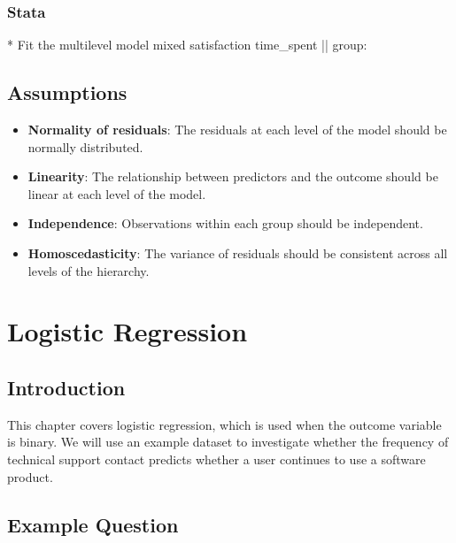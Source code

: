 \documentclass[
  letterpaper,
  DIV=11,
  numbers=noendperiod]{scrreprt}
\newenvironment{Shaded}{\begin{snugshade}}{\end{snugshade}}
\newcommand{\FunctionTok}[1]{\textcolor[rgb]{0.28,0.35,0.67}{#1}}
\newcommand{\KeywordTok}[1]{\textcolor[rgb]{0.00,0.23,0.31}{#1}}
\newcommand{\NormalTok}[1]{\textcolor[rgb]{0.00,0.23,0.31}{#1}}
\providecommand{\tightlist}{%
  \setlength{\itemsep}{0pt}\setlength{\parskip}{0pt}}\usepackage{longtable,booktabs,array}
\begin{document}
\subsection{Stata}\label{stata-2}

\begin{Shaded}
\begin{Highlighting}[]
\NormalTok{* Fit the multilevel }\KeywordTok{model}
\NormalTok{mixed satisfaction time\_spent || }\FunctionTok{group}\NormalTok{:}
\end{Highlighting}
\end{Shaded}

\section{Assumptions}\label{assumptions-2}

\begin{itemize}
\tightlist
\item
  \textbf{Normality of residuals}: The residuals at each level of the
  model should be normally distributed.
\item
  \textbf{Linearity}: The relationship between predictors and the
  outcome should be linear at each level of the model.
\item
  \textbf{Independence}: Observations within each group should be
  independent.
\item
  \textbf{Homoscedasticity}: The variance of residuals should be
  consistent across all levels of the hierarchy.
\end{itemize}


\chapter{Logistic Regression}\label{logistic-regression}

\section{Introduction}\label{introduction-5}

This chapter covers logistic regression, which is used when the outcome
variable is binary. We will use an example dataset to investigate
whether the frequency of technical support contact predicts whether a
user continues to use a software product.

\section{Example Question}\label{example-question-3}
\end{document}

